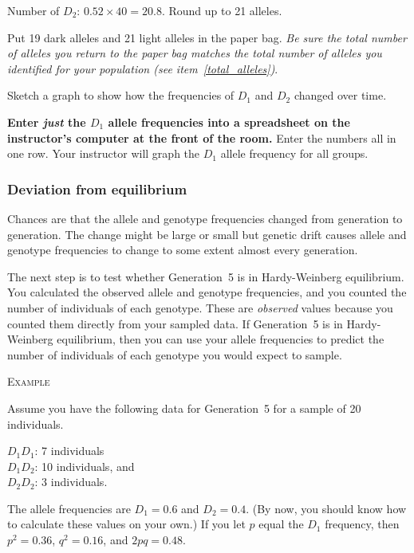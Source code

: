 \documentclass[12pt]{exam}
\newcommand{\allele}[1]{$#1$}
\begin{document}
\begin{questions}
	Number of \allele{D_2}: $0.52 \times 40 = 20.8.$ Round up to 21 alleles.
	
	Put 19 dark alleles and 21 light alleles in the paper bag. \emph{Be sure the total
		number of alleles you return to the paper bag matches the total number 
		of alleles you identified for your population (see item~\ref{total_alleles})}.


\question
Sketch a graph to show how the frequencies of \allele{D_1} and \allele{D_2} changed over time.

\vspace*{18\baselineskip}


\textbf{Enter \emph{just} the \allele{D_1} allele frequencies into a spreadsheet on the instructor's
computer at the front of the room.}  Enter the numbers all 
in one row. Your instructor will graph the \allele{D_1} allele frequency for 
all groups.

\subsubsection*{Deviation from equilibrium}

Chances are that the allele and genotype frequencies changed from generation to 
generation. The change might be large or small but genetic drift causes allele 
and genotype frequencies to change to some extent almost every generation.

The next step is to test whether Generation~5 is in Hardy-Weinberg equilibrium. 
You calculated the observed allele and genotype frequencies, and you counted the 
number of individuals of each genotype. These are \emph{observed} values because 
you counted them directly from your sampled data.  If Generation~5 is in 
Hardy-Weinberg equilibrium, then you can use your allele frequencies to predict 
the number of individuals of each genotype you would expect to sample. \bigskip

\textsc{Example}

\medskip

Assume you have the following data for Generation~5 for a sample of 20 individuals.

$D_1D_1$: 7 individuals  \\
$D_1D_2$: 10 individuals, and\\
$D_2D_2$: 3 individuals.

The allele frequencies are $D_1 = 0.6$ and $D_2 = 0.4$. (By now, you should 
know how to calculate these values on your own.) If you let $p$ equal the $D_1$ 
frequency, then $p^2 = 0.36$, $q^2 = 0.16$, and $2pq = 0.48$.


\end{questions}
\end{document}
